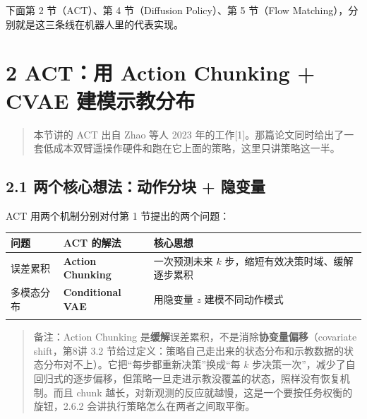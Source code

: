 \documentclass[
  chinese,
]{ctexart}
\begin{document}
下面第 2 节（ACT）、第 4 节（Diffusion Policy）、第 5 节（Flow
Matching），分别就是这三条线在机器人里的代表实现。

\section{2 ACT：用 Action Chunking + CVAE
建模示教分布}\label{actux7528-action-chunking-cvae-ux5efaux6a21ux793aux6559ux5206ux5e03}

\begin{quote}
本节讲的 ACT 出自 Zhao 等人 2023
年的工作{[}1{]}。那篇论文同时给出了一套低成本双臂遥操作硬件和跑在它上面的策略，这里只讲策略这一半。
\end{quote}

\subsection{2.1 两个核心想法：动作分块 +
隐变量}\label{ux4e24ux4e2aux6838ux5fc3ux60f3ux6cd5ux52a8ux4f5cux5206ux5757-ux9690ux53d8ux91cf}

ACT 用两个机制分别对付第 1 节提出的两个问题：

\begin{center}
\begin{tabular}{@{}>{\raggedright\arraybackslash}p{} >{\raggedright\arraybackslash}p{} >{\raggedright\arraybackslash}p{}@{}}
\toprule\noalign{}
问题 & ACT 的解法 & 核心思想 \\
\midrule\noalign{}
误差累积 & \textbf{Action Chunking} & 一次预测未来 \(k\) 步，缩短有效决策时域、缓解逐步累积 \\
多模态分布 & \textbf{Conditional VAE} & 用隐变量 \(z\) 建模不同动作模式 \\
\bottomrule\noalign{}
\end{tabular}
\end{center}

\begin{quote}
备注：Action Chunking
是\textbf{缓解}误差累积，不是消除\textbf{协变量偏移}（covariate
shift，第8讲 3.2
节给过定义：策略自己走出来的状态分布和示教数据的状态分布对不上）。它把``每步都重新决策''换成``每
\(k\)
步决策一次''，减少了自回归式的逐步偏移，但策略一旦走进示教没覆盖的状态，照样没有恢复机制。而且
chunk 越长，对新观测的反应就越慢，这是一个要按任务权衡的旋钮，2.6.2
会讲执行策略怎么在两者之间取平衡。
\end{quote}
\end{document}
